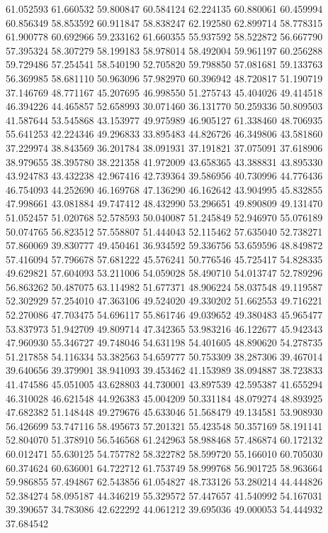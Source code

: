 61.052593
61.660532
59.800847
60.584124
62.224135
60.880061
60.459994
60.856349
58.853592
60.911847
58.838247
62.192580
62.899714
58.778315
61.900778
60.692966
59.233162
61.660355
55.937592
58.522872
56.667790
57.395324
58.307279
58.199183
58.978014
58.492004
59.961197
60.256288
59.729486
57.254541
58.540190
52.705820
59.798850
57.081681
59.133763
56.369985
58.681110
50.963096
57.982970
60.396942
48.720817
51.190719
37.146769
48.771167
45.207695
46.998550
51.275743
45.404026
49.414518
46.394226
44.465857
52.658993
30.071460
36.131770
50.259336
50.809503
41.587644
53.545868
43.153977
49.975989
46.905127
61.338460
48.706935
55.641253
42.224346
49.296833
33.895483
44.826726
46.349806
43.581860
37.229974
38.843569
36.201784
38.091931
37.191821
37.075091
37.618906
38.979655
38.395780
38.221358
41.972009
43.658365
43.388831
43.895330
43.924783
43.432238
42.967416
42.739364
39.586956
40.730996
44.776436
46.754093
44.252690
46.169768
47.136290
46.162642
43.904995
45.832855
47.998661
43.081884
49.747412
48.432990
53.296651
49.890809
49.131470
51.052457
51.020768
52.578593
50.040087
51.245849
52.946970
55.076189
50.074765
56.823512
57.558807
51.444043
52.115462
57.635040
52.738271
57.860069
39.830777
49.450461
36.934592
59.336756
53.659596
48.849872
57.416094
57.796678
57.681222
45.576241
50.776546
45.725417
54.828335
49.629821
57.604093
53.211006
54.059028
58.490710
54.013747
52.789296
56.863262
50.487075
63.114982
51.677371
48.906224
58.037548
49.119587
52.302929
57.254010
47.363106
49.524020
49.330202
51.662553
49.716221
52.270086
47.703475
54.696117
55.861746
49.039652
49.380483
45.965477
53.837973
51.942709
49.809714
47.342365
53.983216
46.122677
45.942343
47.960930
55.346727
49.748046
54.631198
54.401605
48.890620
54.278735
51.217858
54.116334
53.382563
54.659777
50.753309
38.287306
39.467014
39.640656
39.379901
38.941093
39.453462
41.153989
38.094887
38.723833
41.474586
45.051005
43.628803
44.730001
43.897539
42.595387
41.655294
46.310028
46.621548
44.926383
45.004209
50.331184
48.079274
48.893925
47.682382
51.148448
49.279676
45.633046
51.568479
49.134581
53.908930
56.426699
53.747116
58.495673
57.201321
55.423548
50.357169
58.191141
52.804070
51.378910
56.546568
61.242963
58.988468
57.486874
60.172132
60.012471
55.630125
54.757782
58.322782
58.599720
55.166010
60.705030
60.374624
60.636001
64.722712
61.753749
58.999768
56.901725
58.963664
59.986855
57.494867
62.543856
61.054827
48.733126
53.280214
44.444826
52.384274
58.095187
44.346219
55.329572
57.447657
41.540992
54.167031
39.390657
34.783086
42.622292
44.061212
39.695036
49.000053
54.444932
37.684542
